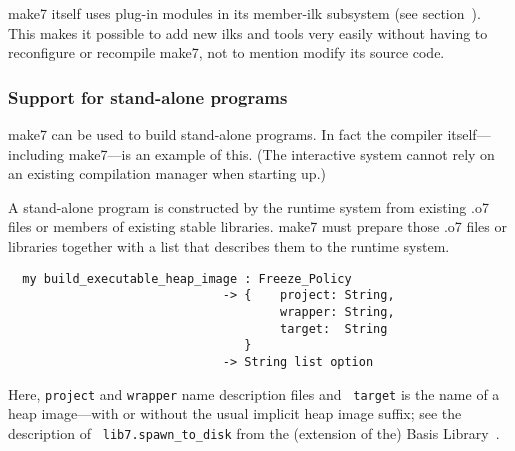 make7 itself uses plug-in modules in its member-ilk subsystem (see
section~).  This makes it possible to add new ilks
and tools very easily without having to reconfigure or recompile make7,
not to mention modify its source code.

\subsubsection{Support for stand-alone programs}
\label{sec:build-an-executable-mythryl-heap-image:support}

make7 can be used to build stand-alone programs. In fact the compiler
itself---including make7---is an example of this.  (The interactive
system cannot rely on an existing compilation manager when starting
up.)

A stand-alone program is constructed by the runtime system from
existing .o7 files or members of existing stable libraries.  make7 must
prepare those .o7 files or libraries together with a list that
describes them to the runtime system.

\begin{verbatim}
  my build_executable_heap_image : Freeze_Policy
                              -> {    project: String,
                                      wrapper: String,
                                      target:  String
                                 }
                              -> String list option
\end{verbatim}

Here, {\tt project} and {\tt wrapper} name description files and {\tt
target} is the name of a heap image---with or without the usual
implicit heap image suffix; see the description of {\tt
lib7.spawn_to_disk} from the (extension of the) Basis
Library~\cite{reppy99:basis}.

